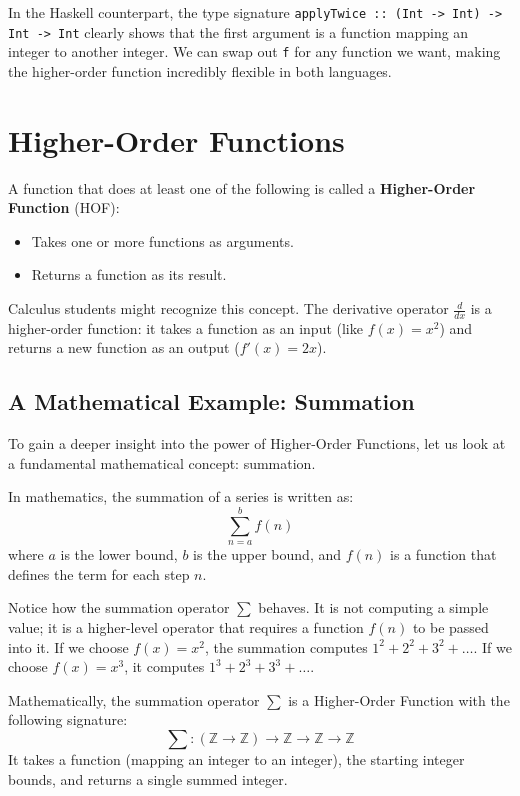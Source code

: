 In the Haskell counterpart, the type signature \texttt{applyTwice :: (Int -> Int) -> Int -> Int} clearly shows that the first argument is a function mapping an integer to another integer. We can swap out \texttt{f} for any function we want, making the higher-order function incredibly flexible in both languages.

\section{Higher-Order Functions}

A function that does at least one of the following is called a \textbf{Higher-Order Function} (HOF):
\begin{itemize}
    \item Takes one or more functions as arguments.
    \item Returns a function as its result.
\end{itemize}

Calculus students might recognize this concept. The derivative operator $\frac{d}{dx}$ is a higher-order function: it takes a function as an input (like $f(x) = x^2$) and returns a new function as an output ($f'(x) = 2x$).

\subsection{A Mathematical Example: Summation}

To gain a deeper insight into the power of Higher-Order Functions, let us look at a fundamental mathematical concept: summation. 

In mathematics, the summation of a series is written as:
\[ \sum_{n=a}^{b} f(n) \]
where $a$ is the lower bound, $b$ is the upper bound, and $f(n)$ is a function that defines the term for each step $n$.

Notice how the summation operator $\sum$ behaves. It is not computing a simple value; it is a higher-level operator that requires a function $f(n)$ to be passed into it. If we choose $f(x) = x^2$, the summation computes $1^2 + 2^2 + 3^2 + \dots$. If we choose $f(x) = x^3$, it computes $1^3 + 2^3 + 3^3 + \dots$. 

Mathematically, the summation operator $\sum$ is a Higher-Order Function with the following signature:
\[ \sum : (\mathbb{Z} \to \mathbb{Z}) \to \mathbb{Z} \to \mathbb{Z} \to \mathbb{Z} \]
It takes a function (mapping an integer to an integer), the starting integer bounds, and returns a single summed integer. 

